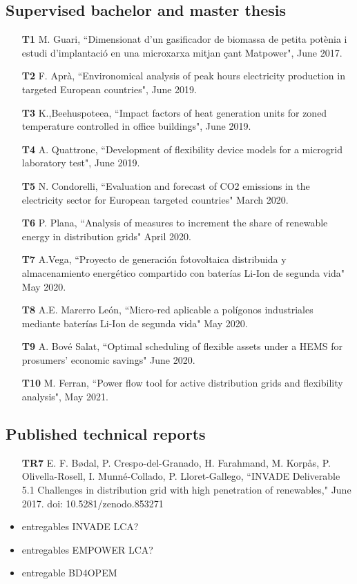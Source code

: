 \subsection*{Supervised bachelor and master thesis}

\begin{itemize}
	\item [\textbf{T1}] M. Guari, ``Dimensionat d'un gasificador de biomassa de petita pot\`{e}nia i estudi d'implantaci\'{o} en una microxarxa mitjan \c{c}ant Matpower", June 2017.
	\item [\textbf{T2}] F. Apr\`{a}, ``Environomical analysis of peak hours electricity production in targeted European countries", June 2019.
	\item [\textbf{T3}] K.,Beehuspoteea,  ``Impact factors of heat generation units for zoned temperature controlled in office buildings", June 2019.
	\item [\textbf{T4}] A. Quattrone, ``Development of flexibility device models for a microgrid laboratory test", June 2019. 
	\item [\textbf{T5}] N. Condorelli, ``Evaluation and forecast of CO2 emissions in the
electricity sector for European targeted countries" March 2020.
	\item [\textbf{T6}] P. Plana, ``Analysis of measures to increment the share of renewable energy in distribution grids" April 2020.
	\item [\textbf{T7}] A.Vega, ``Proyecto de generaci\'{o}n fotovoltaica distribuida y almacenamiento energ\'{e}tico compartido con bater\'{i}as Li-Ion de segunda vida" May 2020.
	\item [\textbf{T8}] A.E. Marerro Le\'{o}n, ``Micro-red aplicable a pol\'{i}gonos industriales mediante bater\'{i}as Li-Ion de segunda vida" May 2020.
	\item [\textbf{T9}] A. Bov\'{e} Salat, ``Optimal scheduling of flexible assets under a HEMS for prosumers' economic savings" June 2020. 
	\item [\textbf{T10}] M. Ferran, ``Power flow tool for active distribution grids and flexibility analysis", May 2021. 
	 
\end{itemize}

\subsection*{Published technical reports}

\begin{itemize}
	\item[\textbf{TR7}] E. F. B\o{}dal, P. Crespo-del-Granado, H. Farahmand, M. Korp\aa{}s, P. Olivella-Rosell, I. Munn\'{e}-Collado, P. Lloret-Gallego, ``INVADE Deliverable 5.1 Challenges in distribution grid with high penetration of renewables," June 2017. doi: 10.5281/zenodo.853271
	\item entregables INVADE LCA? 
	\item entregables EMPOWER LCA? 
	\item entregable BD4OPEM
\end{itemize}
